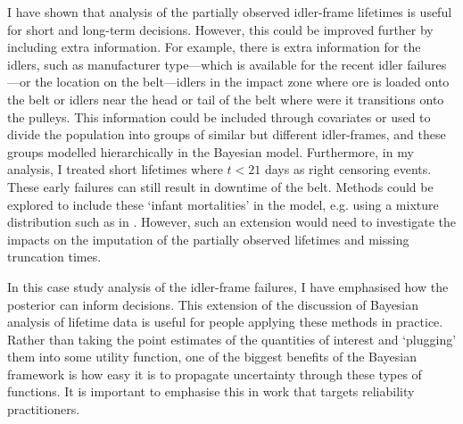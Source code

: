 I have shown that analysis of the partially observed idler-frame lifetimes is useful for short and long-term decisions. However, this could be improved further by including extra information. For example, there is extra information for the idlers, such as manufacturer type---which is available for the recent idler failures---or the location on the belt---idlers in the impact zone where ore is loaded onto the belt or idlers near the head or tail of the belt where were it transitions onto the pulleys. This information could be included through covariates or used to divide the population into groups of similar but different idler-frames, and these groups modelled hierarchically in the Bayesian model. Furthermore, in my analysis, I treated short lifetimes where $t < 21$ days as right censoring events. These early failures can still result in downtime of the belt. Methods could be explored to include these `infant mortalities' in the model, e.g. using a mixture distribution such as in \citep{mittman2013}. However, such an extension would need to investigate the impacts on the imputation of the partially observed lifetimes and missing truncation times.

In this case study analysis of the idler-frame failures, I have emphasised how the posterior can inform decisions. This extension of the discussion of Bayesian analysis of lifetime data is useful for people applying these methods in practice. Rather than taking the point estimates of the quantities of interest and `plugging' them into some utility function, one of the biggest benefits of the Bayesian framework is how easy it is to propagate uncertainty through these types of functions. It is important to emphasise this in work that targets reliability practitioners.